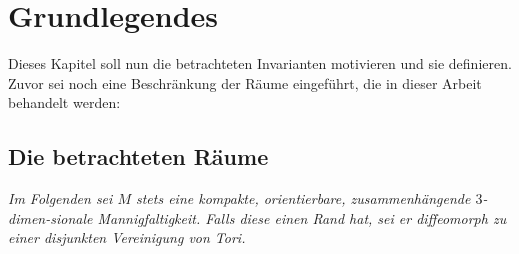 \section{Grundlegendes}
\label{sec:defs}

    Dieses Kapitel soll nun die betrachteten Invarianten motivieren und sie definieren. Zuvor sei noch eine Beschränkung der Räume eingeführt, die in dieser Arbeit behandelt werden:


    \subsection{Die betrachteten Räume}
       \emph{Im Folgenden sei $M$ stets eine kompakte, orientierbare, zusammenhängende $3$-dimen-sionale Mannigfaltigkeit. Falls diese einen Rand hat, sei er diffeomorph zu einer disjunkten Vereinigung von Tori.}

